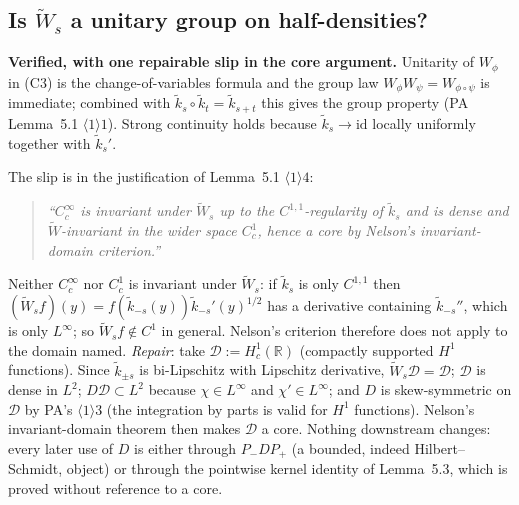 \documentclass[11pt]{article}
\newcommand{\Wt}{\widetilde W}
\newcommand{\kt}{\widetilde k}
\newcommand{\Pp}{P_+}\newcommand{\Pm}{P_-}
\begin{document}
\subsection{Is $\Wt_s$ a unitary group on half-densities?}
\textbf{Verified, with one repairable slip in the core argument.}  Unitarity of $W_\phi$ in (C3) is
the change-of-variables formula and the group law $W_\phi W_\psi=W_{\phi\circ\psi}$ is immediate;
combined with $\kt_s\circ\kt_t=\kt_{s+t}$ this gives the group property (PA Lemma~5.1
$\langle1\rangle1$).  Strong continuity holds because $\kt_s\to\mathrm{id}$ locally uniformly
together with $\kt_s'$.

The slip is in the justification of Lemma~5.1 $\langle1\rangle4$:
\begin{quote}\itshape
``$C_c^\infty$ is invariant under $\Wt_s$ up to the $C^{1,1}$-regularity of $\kt_s$ and is dense and
$\Wt$-invariant in the wider space $C_c^1$, hence a core by Nelson's invariant-domain criterion.''
\end{quote}
Neither $C_c^\infty$ nor $C_c^1$ is invariant under $\Wt_s$: if $\kt_s$ is only $C^{1,1}$ then
$(\Wt_sf)(y)=f(\kt_{-s}(y))\kt_{-s}'(y)^{1/2}$ has a derivative containing $\kt_{-s}''$, which is only
$L^\infty$; so $\Wt_sf\notin C^1$ in general.  Nelson's criterion therefore does not apply to the
domain named.  \emph{Repair}: take $\mathcal D:=H^1_c(\mathbb R)$ (compactly supported $H^1$
functions).  Since $\kt_{\pm s}$ is bi-Lipschitz with Lipschitz derivative, $\Wt_s\mathcal D=\mathcal
D$; $\mathcal D$ is dense in $L^2$; $D\mathcal D\subset L^2$ because $\chi\in L^\infty$ and
$\chi'\in L^\infty$; and $D$ is skew-symmetric on $\mathcal D$ by PA's $\langle1\rangle3$ (the
integration by parts is valid for $H^1$ functions).  Nelson's invariant-domain theorem then makes
$\mathcal D$ a core.  Nothing downstream changes: every later use of $D$ is either through
$\Pm D\Pp$ (a bounded, indeed Hilbert--Schmidt, object) or through the pointwise kernel identity of
Lemma~5.3, which is proved without reference to a core.
\end{document}
